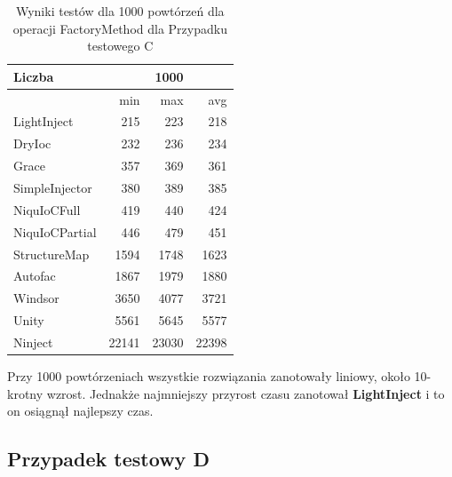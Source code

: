 \documentclass[12pt]{article}
\begin{document}
\begin{table}[H]
\captionsetup{belowskip=0pt,aboveskip=0pt}
\begin{center}
\begin{small}
	\begin{tabular}{ | l | r r r | }
    		\hline
Liczba & & 1000 & \\ \hline
 & min & max & avg \\ \hline
LightInject & 215 & 223 & 218 \\ \hline
DryIoc & 232 & 236 & 234 \\ \hline
Grace & 357 & 369 & 361 \\ \hline
SimpleInjector & 380 & 389 & 385 \\ \hline
NiquIoCFull & 419 & 440 & 424 \\ \hline
NiquIoCPartial & 446 & 479 & 451 \\ \hline
StructureMap & 1594 & 1748 & 1623 \\ \hline
Autofac & 1867 & 1979 & 1880 \\ \hline
Windsor & 3650 & 4077 & 3721 \\ \hline
Unity & 5561 & 5645 & 5577 \\ \hline
Ninject & 22141 & 23030 & 22398 \\ \hline
  	\end{tabular}
\end{small}
\end{center}
\caption{Wyniki testów dla 1000 powtórzeń dla operacji FactoryMethod dla Przypadku testowego C}
\label{TestCaseC_FactoryMethod1000}
\end{table}
Przy 1000 powtórzeniach wszystkie rozwiązania zanotowały liniowy, około 10-krotny wzrost. Jednakże najmniejszy przyrost czasu zanotował \textbf{LightInject} i to on osiągnął najlepszy czas.


\subsection{Przypadek testowy D}
\end{document}
